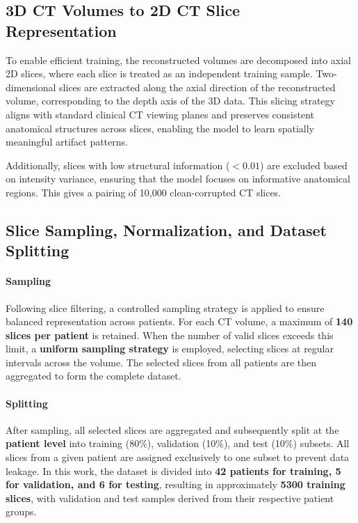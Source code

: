 \subsection{3D CT Volumes to 2D CT Slice Representation}

To enable efficient training, the reconstructed volumes are decomposed into axial 2D slices, where each slice is treated as an independent training sample. Two-dimensional slices are extracted along the axial direction of the reconstructed volume, corresponding to the depth axis of the 3D data. This slicing strategy aligns with standard clinical CT viewing planes and preserves consistent anatomical structures across slices, enabling the model to learn spatially meaningful artifact patterns. 

Additionally, slices with low structural information ($<0.01$) are excluded based on intensity variance, ensuring that the model focuses on informative anatomical regions. This gives a pairing of 10,000 clean-corrupted CT slices. 

\subsection{Slice Sampling, Normalization, and Dataset Splitting }
\paragraph{Sampling}
Following slice filtering, a controlled sampling strategy is applied to ensure balanced representation across patients. For each CT volume, a maximum of \textbf{140 slices per patient} is retained. When the number of valid slices exceeds this limit, a \textbf{uniform sampling strategy} is employed, selecting slices at regular intervals across the volume. The selected slices from all patients are then aggregated to form the complete dataset.
\paragraph{Splitting}
After sampling, all selected slices are aggregated and subsequently split at the \textbf{patient level} into training (80\%), validation (10\%), and test (10\%) subsets.  All slices from a given patient are assigned exclusively to one subset to prevent data leakage.  In this work, the dataset is divided into \textbf{42 patients for training, 5 for validation, and 6 for testing}, resulting in  approximately \textbf{5300 training slices}, with validation and test samples derived from their respective patient groups.
